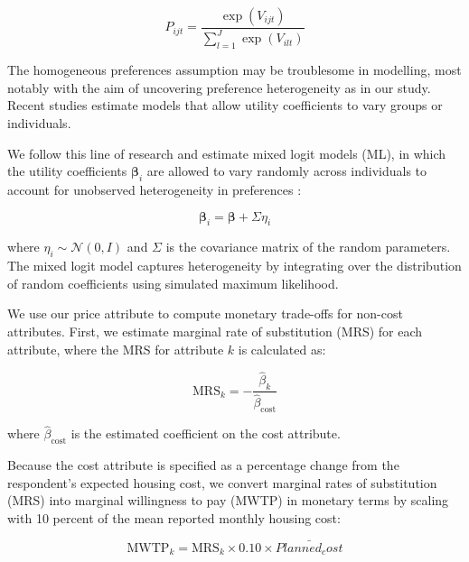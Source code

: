 \documentclass[3p,11pt ]{elsarticle}
\begin{document}
\begin{equation}
P_{ijt} = \frac{\exp(V_{ijt})}{\sum_{l=1}^{J} \exp(V_{ilt})}
\end{equation}

The homogeneous preferences assumption may be troublesome in modelling,
most notably with the aim of uncovering preference heterogeneity as in our study.
Recent studies estimate models that allow utility coefficients to vary groups or individuals\citep{aitkenOlderHomebuyersPrefer2024,zhaoUsingConjointAnalysis2023, caplanMeasuringHeterogeneousPreferences2021}.


We follow this line of research and estimate mixed logit models (ML), in which the utility coefficients \( \boldsymbol{\beta}_i \) are allowed to vary randomly across individuals to account for unobserved heterogeneity in preferences\citep{mcfaddenMixedMNLModels2000}
:

\begin{equation}
\boldsymbol{\beta}_i = \boldsymbol{\beta} + \Sigma \eta_i
\end{equation}

\noindent where \( \eta_i \sim \mathcal{N}(0, I) \) and \( \Sigma \) is the covariance matrix of the random parameters. The mixed logit model captures heterogeneity by integrating over the distribution of random coefficients using simulated maximum likelihood.

We use our price attribute to compute monetary trade-offs for non-cost attributes. 
First,
we estimate marginal rate of substitution (MRS) for each attribute,
where the MRS for attribute \( k \) is calculated as:

\begin{equation}
\text{MRS}_k = -\frac{\hat{\beta}_k}{\hat{\beta}_{\text{cost}}}
\label{eq:mrs}
\end{equation}

\noindent where \( \hat{\beta}_{\text{cost}} \) is the estimated coefficient on the cost attribute.

Because the cost attribute is specified as a percentage change from the respondent’s expected housing cost, we convert marginal rates of substitution (MRS) into marginal willingness to pay (MWTP) in monetary terms by scaling with 10 percent of the mean reported monthly housing cost:

\begin{equation}
\text{MWTP}_k = \text{MRS}_k \times 0.10 \times \bar{Planned_ cost}
\label{eq:mwtp}
\end{equation}
\end{document}
